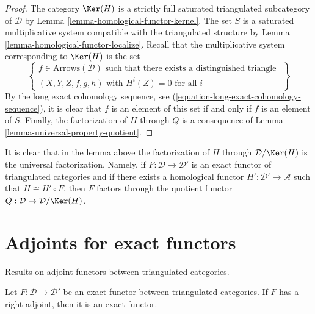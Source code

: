 \begin{proof}
The category $\Ker(H)$ is a strictly full saturated triangulated
subcategory of $\mathcal{D}$ by
Lemma \ref{lemma-homological-functor-kernel}.
The set $S$ is a saturated multiplicative system compatible with the
triangulated structure by
Lemma \ref{lemma-homological-functor-localize}.
Recall that the multiplicative system corresponding to
$\Ker(H)$ is the set
$$
\left\{
\begin{matrix}
f \in \text{Arrows}(\mathcal{D})
\text{ such that there exists a distinguished triangle }\\
(X, Y, Z, f, g, h)\text{ with } H^i(Z) = 0 \text{ for all }i
\end{matrix}
\right\}
$$
By the long exact cohomology sequence, see
(\ref{equation-long-exact-cohomology-sequence}),
it is clear that $f$ is an element of this set if and only if $f$ is
an element of $S$. Finally, the factorization of $H$ through $Q$ is a
consequence of
Lemma \ref{lemma-universal-property-quotient}.
\end{proof}

\noindent
It is clear that in the lemma above the factorization of $H$ through
$\mathcal{D}/\Ker(H)$ is the universal factorization. Namely, if
$F : \mathcal{D} \to \mathcal{D}'$ is an exact functor of triangulated
categories and if there exists a homological functor
$H' : \mathcal{D}' \to \mathcal{A}$ such that $H \cong H' \circ F$, then
$F$ factors through the quotient functor
$Q : \mathcal{D} \to \mathcal{D}/\Ker(H)$.







\section{Adjoints for exact functors}
\label{section-adjoints}

\noindent
Results on adjoint functors between triangulated categories.

\begin{lemma}
\label{lemma-adjoint-is-exact}
Let $F : \mathcal{D} \to \mathcal{D}'$ be an exact functor between
triangulated categories. If $F$ has a right adjoint, then it is
an exact functor.
\end{lemma}

